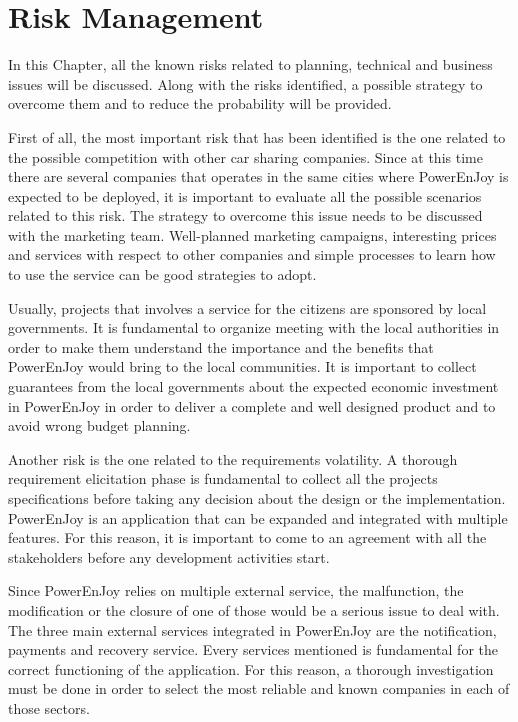 \chapter{Risk Management}
In this Chapter, all the known risks related to planning, technical and business issues will be discussed. Along with the risks identified, a possible strategy to overcome them and to reduce the probability will be provided.

First of all, the most important risk that has been identified is the one related to the possible competition with other car sharing companies. Since at this time there are several companies that operates in the same cities where PowerEnJoy is expected to be deployed, it is important to evaluate all the possible scenarios related to this risk. The strategy to overcome this issue needs to be discussed with the marketing team. Well-planned marketing campaigns, interesting prices and services with respect to other companies and simple processes to learn how to use the service can be good strategies to adopt.

Usually, projects that involves a service for the citizens are sponsored by local governments. It is fundamental to organize meeting with the local authorities in order to make them understand the importance and the benefits that PowerEnJoy would bring to the local communities. It is important to collect guarantees from the local governments about the expected economic investment in PowerEnJoy in order to deliver a complete and well designed product and to avoid wrong budget planning.

Another risk is the one related to the requirements volatility. A thorough requirement elicitation phase is fundamental to collect all the projects specifications before taking any decision about the design or the implementation. PowerEnJoy is an application that can be expanded and integrated with multiple features. For this reason, it is important to come to an agreement with all the stakeholders before any development activities start.

Since PowerEnJoy relies on multiple external service, the malfunction, the modification or the closure of one of those would be a serious issue to deal with. The three main external services integrated in PowerEnJoy are the notification, payments and recovery service. Every services mentioned is fundamental for the correct functioning of the application. For this reason, a thorough investigation must be done in order to select the most reliable and known companies in each of those sectors.

